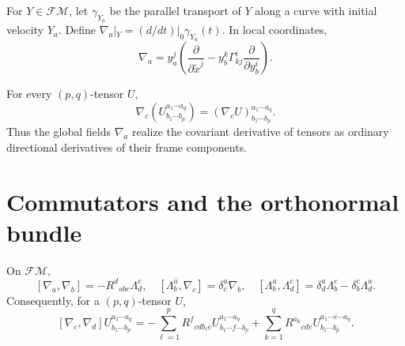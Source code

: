 \begin{definition}
\label{def:chow-ii-horizontal-frame-fields}

For $Y\in\mathcal F\mathcal M$, let $\gamma_{Y_a}$ be the parallel transport
of $Y$ along a curve with initial velocity $Y_a$.  Define
$\nabla_a|_Y=(d/dt)|_{0}\gamma_{Y_a}(t)$.  In local coordinates,
\[
 \nabla_a=y_a^j\left(\frac{\partial}{\partial \widetilde x^j}
 -y_b^k\Gamma^i_{kj}\frac{\partial}{\partial y_b^i}\right).
\]
\end{definition}

\begin{lemma}
\label{lem:chow-ii-horizontal-covariant-differentiation}


For every $(p,q)$-tensor $U$,
\[
 \nabla_c\!\left(U^{a_1\cdots a_q}_{b_1\cdots b_p}\right)
 =(\nabla_cU)^{a_1\cdots a_q}_{b_1\cdots b_p}.
\]
Thus the global fields $\nabla_a$ realize the covariant derivative of tensors
as ordinary directional derivatives of their frame components.
\end{lemma}

\section{Commutators and the orthonormal bundle}

\begin{lemma}
\label{lem:chow-ii-frame-bundle-commutators}


On $\mathcal F\mathcal M$,
\[
 [\nabla_a,\nabla_b]=-R^d{}_{abc}\Lambda^c_d,
\quad [\Lambda^a_b,\nabla_c]=\delta^a_c\nabla_b,
\quad [\Lambda^a_b,\Lambda^c_d]=\delta^a_d\Lambda^c_b-\delta^c_b\Lambda^a_d.
\]
Consequently, for a $(p,q)$-tensor $U$,
\[
 [\nabla_c,\nabla_d]U^{a_1\cdots a_q}_{b_1\cdots b_p}
 =-\sum_{\ell=1}^pR^f{}_{cdb_\ell e}U^{a_1\cdots a_q}_{b_1\cdots f\cdots b_p}
 +\sum_{k=1}^qR^{a_k}{}_{cde}U^{a_1\cdots e\cdots a_q}_{b_1\cdots b_p}.
\]
\end{lemma}

